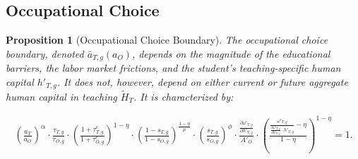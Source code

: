 \documentclass[onehalfspacing,11pt]{article}
\newtheorem{prp}{Proposition}
\begin{document}
		\subsection{Occupational Choice}%
	
	
	\begin{prp}[Occupational Choice Boundary] The occupational choice boundary, denoted $\bar{a}_{T,g}(a_O)$, depends on the magnitude of the educational barriers, the labor market frictions, and the student's teaching-specific human capital $h'_{T,g}$. It does not, however, depend on either current or future aggregate human capital in teaching $\widetilde{H}_T$. It is characterized by:
		
		\begin{align}
			\label{eq:occChoice}
			\left(\frac{a_T}{a_O}\right)^\alpha \cdot \frac{\tau_{T,g}}{\tau_{O,g}} \cdot \left(\frac{1+\tau^e_{T,g}}{1+\tau^e_{O,g}}\right)^{1-\eta}  \cdot \left(\frac{1-s_{T,g}}{1-s_{O,g}}\right)^\frac{1-\eta}{\mu} \cdot \left(\frac{s_{T,g}}{s_{O,g}}\right)^\phi \cdot \frac{\frac{\partial \omega'_{T,g}}{\partial h'_{T,g}}}{A'_O} \cdot \left(\frac{ \frac{\omega'_{T,g}}{\frac{\partial \omega'_{T,g}}{\partial h'_{T,g}} \cdot h'_{T,g}}-\eta}{1-\eta}\right)^{1-\eta}=1.
		\end{align}
	\end{prp}
	
	\newpage
\end{document}
